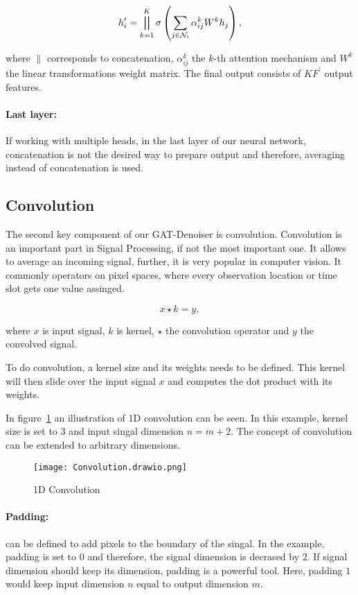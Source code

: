 \begin{equation}
  h_i^{\prime} = \bigparallel^K_{k=1} \sigma \left(\sum_{j \in \mathcal{N}_i} \alpha_{ij}^k W^k h_j \right),  
\end{equation}

where $\parallel$ corresponds to concatenation, $\alpha_{ij}^k$ the $k$-th attention mechanism and $W^k$ the linear
transformations weight matrix. The final output consists of $KF^{\prime}$ output features.

\paragraph{Last layer:}
If working with multiple heads, in the last layer of our neural network, concatenation is not the desired 
way to prepare output and therefore, averaging instead of concatenation is used.

\subsection{Convolution}
The second key component of our GAT-Denoiser is convolution.
Convolution is an important part in Signal Processing, if not the most important one.
It allows to average an incoming signal, further, it is very popular in computer vision.
It commonly operators on pixel spaces, where every observation location or time slot gets one value assinged.

\begin{equation}
  x \star k = y,
\end{equation}

where $x$ is input signal, $k$ is kernel, $\star$ the convolution operator and $y$ the convolved signal.

To do convolution, a kernel size and its weights needs to be defined. 
This kernel will then slide over the input signal $x$ and computes the dot product with its weights.

In figure~\ref{fig:1d-convolution} an illustration of 1D convolution can be seen. In this example,
kernel size is set to 3 and input singal dimension $n = m + 2$. The concept of convolution can be
extended to arbitrary dimensions.

\begin{figure}[H]
  \centering
  \label{fig:1d-convolution}
  \texttt{[image: Convolution.drawio.png]}
  \caption{1D Convolution}
\end{figure}

\paragraph{Padding:} 
can be defined to add pixels to the boundary of the singal.
In the example, padding is set to $0$ and therefore, the signal dimension is decrased by 2.
If signal dimension should keep its dimension, padding is a powerful tool. Here, padding $1$
would keep input dimension $n$ equal to output dimension $m$.


